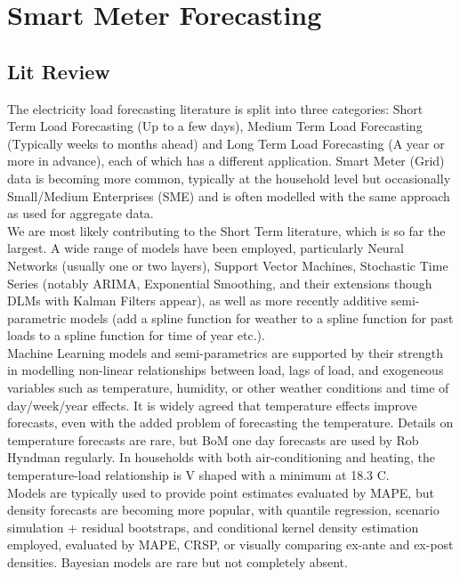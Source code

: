 \documentclass[12pt,a4paper]{article}\usepackage[]{graphicx}\usepackage[]{color}
\begin{document}
\section{Smart Meter Forecasting}

\subsection{Lit Review}

The electricity load forecasting literature is split into three categories: Short Term Load Forecasting (Up to a few days), Medium Term Load Forecasting (Typically weeks to months ahead) and Long Term Load Forecasting (A year or more in advance), each of which has a different application. Smart Meter (Grid) data is becoming more common, typically at the household level but occasionally Small/Medium Enterprises (SME) and is often modelled with the same approach as used for aggregate data. 
\\

We are most likely contributing to the Short Term literature, which is so far the largest. A wide range of models have been employed, particularly Neural Networks (usually one or two layers), Support Vector Machines, Stochastic Time Series (notably ARIMA, Exponential Smoothing, and their extensions though DLMs with Kalman Filters appear), as well as more recently additive semi-parametric models (add a spline function for weather to a spline function for past loads to a spline function for time of year etc.). 
\\

Machine Learning models and semi-parametrics are supported by their strength in modelling non-linear relationships between load, lags of load, and exogeneous variables such as temperature, humidity, or other weather conditions and time of day/week/year effects. It is widely agreed that temperature effects improve forecasts, even with the added problem of forecasting the temperature. Details on temperature forecasts are rare, but BoM one day forecasts are used by Rob Hyndman regularly. In households with both air-conditioning and heating, the temperature-load relationship is V shaped with a minimum at 18.3 C.
\\

Models are typically used to provide point estimates evaluated by MAPE, but density forecasts are becoming more popular, with quantile regression, scenario simulation + residual bootstraps, and conditional kernel density estimation employed, evaluated by MAPE, CRSP, or visually comparing ex-ante and ex-post densities. Bayesian models are rare but not completely absent.
\\
\end{document}
